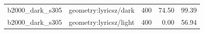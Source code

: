 \begin{longtable}{l>{\raggedright\arraybackslash}p{.42\linewidth}rrr}
b2000\_\allowbreak{}dark\_\allowbreak{}s305 & %
geometry:lyricsz/dark & %
400 & %
74.50 & %
99.39 \\ %

b2000\_\allowbreak{}dark\_\allowbreak{}s305 & %
geometry:lyricsz/light & %
400 & %
0.00 & %
56.94 \\ %


\end{longtable}
